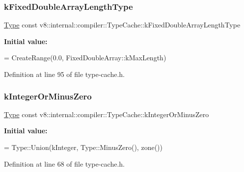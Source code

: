 \subsubsection{\texorpdfstring{k\+Fixed\+Double\+Array\+Length\+Type}{kFixedDoubleArrayLengthType}}
{\footnotesize\ttfamily \mbox{\hyperlink{classv8_1_1internal_1_1compiler_1_1Type}{Type}} const v8\+::internal\+::compiler\+::\+Type\+Cache\+::k\+Fixed\+Double\+Array\+Length\+Type}

{\bfseries Initial value\+:}
\begin{DoxyCode}
=
      CreateRange(0.0, FixedDoubleArray::kMaxLength)
\end{DoxyCode}


Definition at line 95 of file type-\/cache.\+h.

\mbox{\label{classv8_1_1internal_1_1compiler_1_1TypeCache_a2fe7e48a33b58fcd61512bd069e69395}} 
\subsubsection{\texorpdfstring{k\+Integer\+Or\+Minus\+Zero}{kIntegerOrMinusZero}}
{\footnotesize\ttfamily \mbox{\hyperlink{classv8_1_1internal_1_1compiler_1_1Type}{Type}} const v8\+::internal\+::compiler\+::\+Type\+Cache\+::k\+Integer\+Or\+Minus\+Zero}

{\bfseries Initial value\+:}
\begin{DoxyCode}
=
      Type::Union(kInteger, Type::MinusZero(), zone())
\end{DoxyCode}


Definition at line 68 of file type-\/cache.\+h.

\mbox{\label{classv8_1_1internal_1_1compiler_1_1TypeCache_a304e1415f07317a8a3b4b176cd222290}} 
